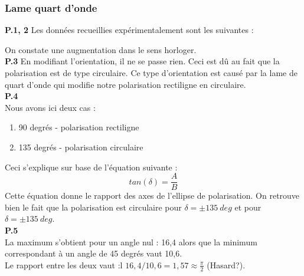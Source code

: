 \documentclass	[11pt, a4paper, openany]{book}
\begin{document}
		\subsubsection*{Lame quart d'onde}
		\textbf{P.1, 2}
		Les données recueillies expérimentalement sont les suivantes :
		\begin{center}
		\end{center}
		On constate une augmentation dans le sens horloger.\\
		
		\textbf{P.3}
		En modifiant l'orientation, il ne se passe rien. Ceci est dû au fait que la polarisation est de type circulaire. Ce type d'orientation est causé par la lame de quart d'onde qui modifie notre polarisation rectiligne en circulaire.\\
		 
		\textbf{P.4}\\
		Nous avons ici deux cas : 
		\begin{enumerate}
			\item 90 degrés - polarisation rectiligne
			\item 135 degrés - polarisation circulaire
		\end{enumerate}
		Ceci s'explique sur base de l'équation suivante : 
		\begin{equation}
			tan(\delta) = \frac{A}{B}
		\end{equation}
		Cette équation donne le rapport des axes de l'ellipse de polarisation. On retrouve bien le fait que la polarisation est circulaire pour $\delta = \pm 135\ deg$ et pour $\delta = \pm 135\ deg$.\\
		
		\textbf{P.5}\\
		La maximum s'obtient pour un angle nul : 16,4 alors que la minimum correspondant à un angle de 45 degrés vaut 10,6.\\
		Le rapport entre les deux vaut :l $16,4/10,6 = 1,57 \approx \frac{\pi}{2}$ (Hasard?).\\
		
\end{document}
